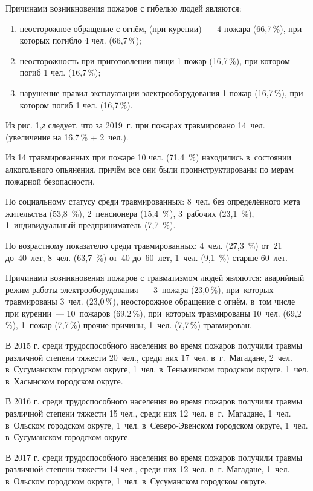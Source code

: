 Причинами возникновения пожаров с гибелью людей являются:
\begin{enumerate}[noitemsep]\vspace{-8pt}
\item неосторожное обращение с огнём, (при курении)~--- 4 пожара (66,7\,\%), при которых погибло 4 чел. (66,7\,\%);
\item неосторожность при приготовлении пищи 1 пожар (16,7\,\%), при котором погиб 1 чел. (16,7\,\%);
\item нарушение правил эксплуатации электрооборудования 1 пожар (16,7\,\%), при котором погиб 1 чел. (16,7\,\%).
\end{enumerate}
\vspace{-6pt}

Из рис. 1,\textit{г} следует, что за 2019~г. при пожарах травмировано 14~чел. (увеличение на 16,7\,\% + 2~чел.).

Из 14 травмированных при пожаре 10 чел. (71,4~\%) находились в~состоянии
алкогольного опьянения, причём все они были проинструктированы по мерам
пожарной безопасности.

По социальному статусу среди травмированных: 8~чел. без определённого
мета жительства (53,8~\%), 2~пенсионера (15,4~\%), 3~рабочих (23,1~\%), 1~индивидуальный предприниматель (7,7~\%).

По возрастному показателю среди травмированных: 4~чел. (27,3~\%) от~21 до~40~лет, 8~чел. (63,7~\%) от~40 до~60~лет, 1~чел. (9,1~\%) старше 60~лет.

Причинами возникновения пожаров с травматизмом людей являются: аварийный режим работы электрооборудования~--- 3~пожара (23,0\,\%), при~которых травмированы 3~чел. (23,0\,\%), неосторожное обращение с огнём, в~том числе при курении~--- 10~пожаров (69,2\,\%), при~которых травмированы 10~чел. (69,2\,\%), 1~пожар (7,7\,\%) прочие причины, 1~чел. (7,7\,\%) травмирован.

В 2015 г. среди трудоспособного населения во время пожаров получили травмы различной степени тяжести 20~чел., среди них 17~чел. в~г.~Магадане, 2~чел. в~Сусуманском городском округе, 1~чел. в~Тенькинском городском округе, 1~чел. в~Хасынском городском округе.

В 2016 г. среди трудоспособного населения во время пожаров получили травмы различной степени тяжести 15 чел., среди них 12~чел. в~г.~Магадане, 1~чел. в~Ольском городском округе, 1~чел. в~Северо-Эвенском городском округе, 1~чел. в~Сусуманском городском округе.

В 2017 г. среди трудоспособного населения во время пожаров получили травмы различной степени тяжести 14 чел., среди них 12~чел. в~г. Магадане, 1~чел. в~Ольском городском округе, 1~чел. в~Сусуманском городском округе.

